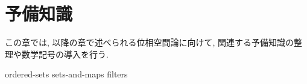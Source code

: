 \documentclass[uplatex, dvipdfmx, a4paper, 12pt, class=jsbook, crop=false]{standalone}
\begin{document}
\chapter{予備知識}
\label{chap:preliminaries}

この章では, 以降の章で述べられる位相空間論に向けて,
関連する予備知識の整理や数学記号の導入を行う.

{ordered-sets}
{sets-and-maps}
{filters}
\end{document}
